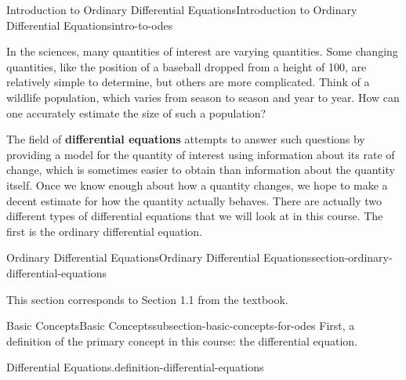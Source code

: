 \documentclass[oneside,10pt,]{book}
\newcommand{\terminology}[1]{\textbf{#1}}
\numberwithin{equation}{section}
\begin{document}
%
%
\typeout{************************************************}
\typeout{************************************************}
%
\begin{chapterptx}{Introduction to Ordinary Differential Equations}{}{Introduction to Ordinary Differential Equations}{}{}{intro-to-odes}
\begin{introduction}{}%
\hypertarget{p-1}{}%
In the sciences, many quantities of interest are varying quantities. Some changing quantities, like the position of a baseball dropped from a height of \SI{100}{\foot}, are relatively simple to determine, but others are more complicated. Think of a wildlife population, which varies from season to season and year to year. How can one accurately estimate the size of such a population?%
\par
\hypertarget{p-2}{}%
The field of \terminology{differential equations} attempts to answer such questions by providing a model for the quantity of interest using information about its rate of change, which is sometimes easier to obtain than information about the quantity itself. Once we know enough about how a quantity changes, we hope to make a decent estimate for how the quantity actually behaves. There are actually two different types of differential equations that we will look at in this course. The first is the ordinary differential equation.%
\end{introduction}%
%
%
\typeout{************************************************}
\typeout{************************************************}
%
\begin{sectionptx}{Ordinary Differential Equations}{}{Ordinary Differential Equations}{}{}{section-ordinary-differential-equations}
\begin{introduction}{}%
\hypertarget{p-3}{}%
This section corresponds to Section 1.1 from the textbook.%
\end{introduction}%
%
%
\typeout{************************************************}
\typeout{************************************************}
%
\begin{subsectionptx}{Basic Concepts}{}{Basic Concepts}{}{}{subsection-basic-concepts-for-odes}
\hypertarget{p-4}{}%
First, a definition of the primary concept in this course: the differential equation.%
\begin{definition}{Differential Equations.}{definition-differential-equations}%
\hypertarget{p-5}{}%

\end{definition}
\end{subsectionptx}
\end{sectionptx}
\end{chapterptx}
\end{document}
